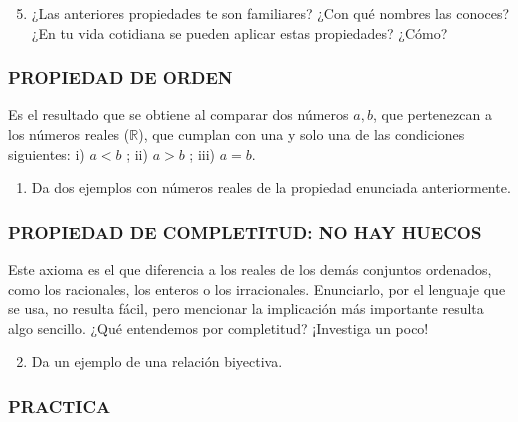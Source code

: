 \documentclass[12pt,a4paper]{article}
\begin{document}
\vspace{0.5cm}

\begin{enumerate}
\setcounter{enumi}{4}
\item ¿Las anteriores propiedades te son familiares? ¿Con qué nombres las conoces? ¿En tu vida cotidiana se pueden aplicar estas propiedades? ¿Cómo?
\end{enumerate}

\vspace{0.5cm}

\subsubsection*{PROPIEDAD DE ORDEN}

Es el resultado que se obtiene al comparar dos números $a, b$, que pertenezcan a los números reales ($\mathbb{R}$), que cumplan con una y solo una de las condiciones siguientes: i) $a < b$ ; ii) $a > b$ ; iii) $a = b$.

\begin{enumerate}
\item Da dos ejemplos con números reales de la propiedad enunciada anteriormente.
\end{enumerate}

\vspace{0.5cm}

\subsubsection*{PROPIEDAD DE COMPLETITUD: NO HAY HUECOS}

Este axioma es el que diferencia a los reales de los demás conjuntos ordenados, como los racionales, los enteros o los irracionales. Enunciarlo, por el lenguaje que se usa, no resulta fácil, pero mencionar la implicación más importante resulta algo sencillo. ¿Qué entendemos por completitud? ¡Investiga un poco!


\begin{enumerate}
\setcounter{enumi}{1}
\item Da un ejemplo de una relación biyectiva.
\end{enumerate}

\vspace{0.5cm}

\subsubsection*{PRACTICA}
\end{document}
